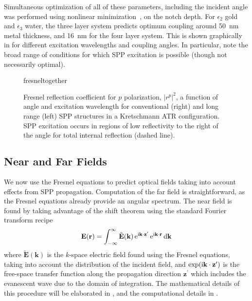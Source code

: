 Simultaneous optimization of all of these parameters, including the
incident angle was performed using nonlinear
minimization~\cite{brent1973algorithms}, on the notch depth.  For
$\epsilon_2$ gold and $\epsilon_3$ water, the three layer system predicts
optimum coupling around \SI{50}{\nano\meter} metal thickness, and
\SI{16}{\nano\meter} for the four layer system.  This is shown graphically
in  for different excitation wavelengths and
coupling angles.  In particular, note the broad range of conditions for
which SPP excitation is possible (though not necessarily optimal).

\begin{figure}[ht]
\centering
{fresneltogether}
\caption{Fresnel reflection coefficient for $p$ polarization, $|r^p|^2$, a
function of angle and excitation wavelength for conventional (right) and
long range (left) SPP structures in a Kretschmann ATR configuration.  SPP
excitation occurs in regions of low reflectivity to the right of the angle
for total internal reflection (dashed line).}
\label{fig:fresnelangle}
\end{figure}

\subsection{Near and Far Fields} \label{sec:fresnelnearfar}
We now use the Fresnel equations to predict optical fields taking into
account effects from SPP propagation.  Computation of the far field is
straightforward, as the Fresnel equations already provide an angular
spectrum.  The near field is found by taking advantage of the shift theorem
using the standard Fourier transform recipe
\begin{equation}
\mathbf{E}(\mathbf{r}) = \int_{-\infty}^{\infty} \tilde{\mathbf{E}}(\mathbf{k})
\,{\mathrm{e}}^{{\mathrm{i}} \mathbf{k} \cdot \mathbf{z}^\prime}
\,{\mathrm{e}}^{{\mathrm{i}} \mathbf{k} \cdot \mathbf{r}}\,\mathrm{d} \mathbf{k}
\end{equation}
where $\tilde{\mathbf{E}}(\mathbf{k})$ is the $k$-space electric field
found using the Fresnel equations, taking into account the distribution of
the incident field, and $\exp({\mathrm{i}} \mathbf{k} \cdot
\mathbf{z}^\prime)$ is the free-space transfer function along the 
propagation direction $\mathbf{z}^\prime$ which includes the evanescent
wave due to the domain of integration.  The mathematical details of this procedure
will be elaborated in , and the
computational details in .

